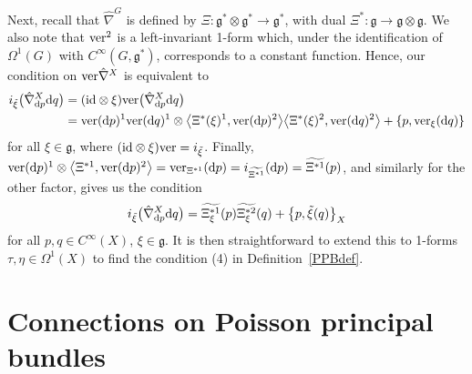 \documentclass[10pt,a4paper]{amsart}
\numberwithin{equation}{section}
\newcommand{\<}{{\langle}}
\renewcommand{\>}{{\rangle}}
\newcommand{\tens}{\otimes}
\newcommand{\id}{{\rm id}}
\newcommand{\extd}{{\rm d}}
\newcommand{\cg}{{\mathfrak{g}}}
\newcommand{\ver}{{\rm ver}}
\begin{document}
\begin{Remark}
Next, recall that $\hat\nabla^G$ is defined by $\Xi\colon \mathfrak{g}^*\tens\mathfrak{g}^*\rightarrow \mathfrak{g}^*$, with dual $\Xi^*\colon \mathfrak{g}\rightarrow\mathfrak{g}\tens\mathfrak{g}$. We also note that $\ver^2$ is a left-invariant 1-form which, under the identification of $\Omega^1(G)$ with $C^\infty(G,\cg^*)$, corresponds to a constant function. Hence, our condition on $\ver \hat\nabla^X$ is equivalent to
\begin{align*}
i_{\tilde\xi}\big(\hat{\nabla}^X_{\extd p}\extd q\big)&= (\id\tens\xi)\ver \big(\hat{\nabla}^X_{\extd p}\extd q\big)\\
&=\ver (\extd p)^1\ver (\extd q)^1\tens\big\langle\Xi^*(\xi)^1,\ver (\extd p)^2\big\rangle
\big\langle\Xi^*(\xi)^2,\ver (\extd q)^2\big\rangle+ \lbrace p,\ver _\xi(\extd q) \rbrace
\end{align*}
for all $\xi\in\cg$, where $(\id\tens\xi)\ver =i_{\tilde\xi}$. Finally, $\ver (\extd p)^1\tens\big\langle\Xi^{*1},\ver (\extd p)^2\big\rangle=\ver _{\Xi^{*1}}(\extd p)=i_{\widetilde{\Xi^{*1}}}(\extd p)=\widetilde{\Xi^{*1}}(p)$, and similarly for the other factor, gives us the condition
\begin{equation*}%
i_{\tilde\xi}\big(\hat{\nabla}^X_{\extd p}\extd q\big)=\widetilde{\Xi^{*1}_\xi}(p)\widetilde{\Xi^{*2}_\xi}(q)+\big\lbrace p,{\tilde\xi}(q)\big\rbrace_X
\end{equation*}
for all $p,q\in C^\infty(X)$, $\xi\in\mathfrak{g}$. It is then straightforward to extend this to 1-forms $\tau,\eta\in\Omega^1(X)$ to find the condition (4) in Definition~\ref{PPBdef}. \end{Remark}

\section{Connections on Poisson principal bundles}\label{Assocsec}
\end{document}
